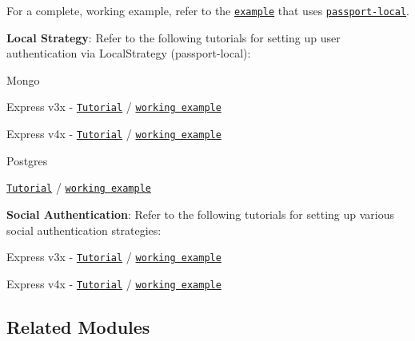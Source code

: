 \begin{DoxyItemize}
\item For a complete, working example, refer to the \href{https://github.com/passport/express-4.x-local-example}{\tt example} that uses \href{https://github.com/jaredhanson/passport-local}{\tt passport-\/local}.
\item {\bfseries Local Strategy}\+: Refer to the following tutorials for setting up user authentication via Local\+Strategy ({\ttfamily passport-\/local})\+:
\begin{DoxyItemize}
\item Mongo
\begin{DoxyItemize}
\item Express v3x -\/ \href{http://mherman.org/blog/2016/09/25/node-passport-and-postgres/#.V-govpMrJE5}{\tt Tutorial} / \href{https://github.com/mjhea0/passport-local-knex}{\tt working example}
\item Express v4x -\/ \href{http://mherman.org/blog/2015/01/31/local-authentication-with-passport-and-express-4/}{\tt Tutorial} / \href{https://github.com/mjhea0/passport-local-express4}{\tt working example}
\end{DoxyItemize}
\item Postgres
\begin{DoxyItemize}
\item \href{http://mherman.org/blog/2015/01/31/local-authentication-with-passport-and-express-4/}{\tt Tutorial} / \href{https://github.com/mjhea0/passport-local-express4}{\tt working example}
\end{DoxyItemize}
\end{DoxyItemize}
\item {\bfseries Social Authentication}\+: Refer to the following tutorials for setting up various social authentication strategies\+:
\begin{DoxyItemize}
\item Express v3x -\/ \href{http://mherman.org/blog/2013/11/10/social-authentication-with-passport-dot-js/}{\tt Tutorial} / \href{https://github.com/mjhea0/passport-examples}{\tt working example}
\item Express v4x -\/ \href{http://mherman.org/blog/2015/09/26/social-authentication-in-node-dot-js-with-passport}{\tt Tutorial} / \href{https://github.com/mjhea0/passport-social-auth}{\tt working example}
\end{DoxyItemize}
\end{DoxyItemize}

\subsection*{Related Modules}


